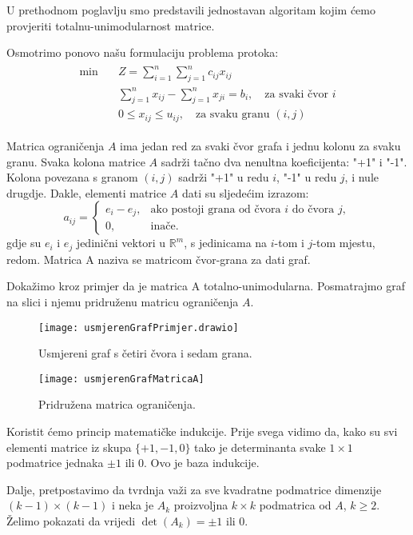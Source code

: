 \documentclass[11pt, a4paper]{article}
\begin{document}
	U prethodnom poglavlju smo predstavili jednostavan algoritam kojim ćemo provjeriti totalnu-unimodularnost matrice.
	
	Osmotrimo ponovo našu formulaciju problema protoka:
	\begin{align*}
		\begin{split}
			\text{min} \quad & Z = \sum_{i=1}^{n}\sum_{j=1}^{n} c_{ij}x_{ij} \\
			& \sum_{j=1}^{n} x_{ij} - \sum_{j=1}^{n} x_{ji} = b_i, \quad\text{za svaki čvor } i \\
			& 0 \leq x_{ij} \leq u_{ij}, \quad\text{za svaku granu } (i,j)
		\end{split}
	\end{align*}
	
	Matrica ograničenja $A$ ima jedan red za svaki čvor grafa i jednu kolonu za svaku granu. Svaka kolona matrice $A$ sadrži tačno dva nenultna koeficijenta: "+1" i "-1". Kolona povezana s granom $(i,j)$ sadrži "+1" u redu $i$, "-1" u redu $j$, i nule drugdje. Dakle, elementi matrice $A$ dati su sljedećim izrazom:
	\[
	a_{ij}=
	\begin{cases}
		e_i - e_j, & \text{ako postoji grana od čvora $i$ do čvora $j$}, \\
		0, & \text{inače}.
	\end{cases}
	\]
	gdje su $e_i$ i $e_j$ jedinični vektori u $\mathbb{R}^m$, s jedinicama na $i$-tom i $j$-tom mjestu, redom. Matrica A naziva se matricom čvor-grana za dati graf.
	
	Dokažimo kroz primjer da je matrica A totalno-unimodularna. Posmatrajmo graf na slici i njemu pridruženu matricu ograničenja $A$.
	
	\begin{figure}[h]
	\centering
	\texttt{[image: usmjerenGrafPrimjer.drawio]}
	\caption{Usmjereni graf s četiri čvora i sedam grana.}
	\label{fig:graf1}
	\end{figure}
	
	\pagebreak
	\begin{figure}[h]
		\centering
		\texttt{[image: usmjerenGrafMatricaA]}
		\caption{Pridružena matrica ograničenja.}
		\label{fig:graf1MatricaA}
	\end{figure}
	
	Koristit ćemo princip matematičke indukcije. Prije svega vidimo da, kako su svi elementi matrice iz skupa $\{+1,-1,0\}$ tako je determinanta svake $1 \times 1$ podmatrice jednaka $\pm 1$ ili $0$. Ovo je baza indukcije.
	
	Dalje, pretpostavimo da tvrdnja važi za sve kvadratne podmatrice dimenzije $(k-1) \times (k-1)$ i neka je $A_{k}$ proizvoljna $k \times k$ podmatrica od $A$, $k \geq 2$. Želimo pokazati da vrijedi $\det(A_{k}) = \pm 1$ ili $0$.
	
\end{document}
